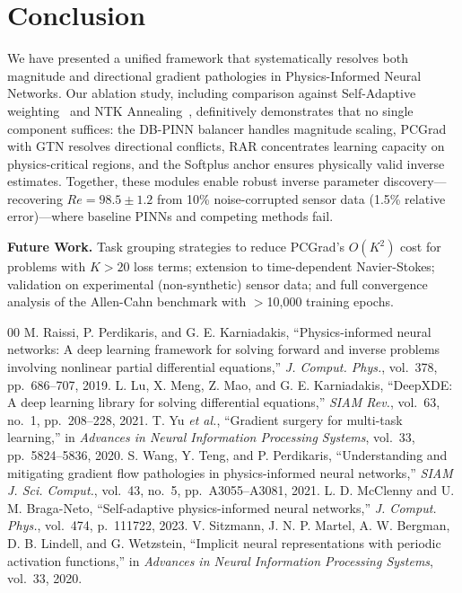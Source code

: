 \documentclass[conference]{IEEEtran}
\begin{document}
\section{Conclusion}
\label{sec:conclusion}

We have presented a unified framework that systematically resolves both magnitude and directional gradient pathologies in Physics-Informed Neural Networks. Our ablation study, including comparison against Self-Adaptive weighting~\cite{b5} and NTK Annealing~\cite{b4}, definitively demonstrates that no single component suffices: the DB-PINN balancer handles magnitude scaling, PCGrad with GTN resolves directional conflicts, RAR concentrates learning capacity on physics-critical regions, and the Softplus anchor ensures physically valid inverse estimates. Together, these modules enable robust inverse parameter discovery---recovering $Re = 98.5 \pm 1.2$ from 10\% noise-corrupted sensor data (1.5\% relative error)---where baseline PINNs and competing methods fail.

\textbf{Future Work.} Task grouping strategies to reduce PCGrad's $O(K^2)$ cost for problems with $K > 20$ loss terms; extension to time-dependent Navier-Stokes; validation on experimental (non-synthetic) sensor data; and full convergence analysis of the Allen-Cahn benchmark with $>$10{,}000 training epochs.

\begin{thebibliography}{00}
 M. Raissi, P. Perdikaris, and G. E. Karniadakis, ``Physics-informed neural networks: A deep learning framework for solving forward and inverse problems involving nonlinear partial differential equations,'' \emph{J. Comput. Phys.}, vol.~378, pp.~686--707, 2019.
 L. Lu, X. Meng, Z. Mao, and G. E. Karniadakis, ``DeepXDE: A deep learning library for solving differential equations,'' \emph{SIAM Rev.}, vol.~63, no.~1, pp.~208--228, 2021.
 T. Yu \emph{et al.}, ``Gradient surgery for multi-task learning,'' in \emph{Advances in Neural Information Processing Systems}, vol.~33, pp.~5824--5836, 2020.
 S. Wang, Y. Teng, and P. Perdikaris, ``Understanding and mitigating gradient flow pathologies in physics-informed neural networks,'' \emph{SIAM J. Sci. Comput.}, vol.~43, no.~5, pp.~A3055--A3081, 2021.
 L. D. McClenny and U. M. Braga-Neto, ``Self-adaptive physics-informed neural networks,'' \emph{J. Comput. Phys.}, vol.~474, p.~111722, 2023.
 V. Sitzmann, J. N. P. Martel, A. W. Bergman, D. B. Lindell, and G. Wetzstein, ``Implicit neural representations with periodic activation functions,'' in \emph{Advances in Neural Information Processing Systems}, vol.~33, 2020.
\end{thebibliography}
\end{document}
